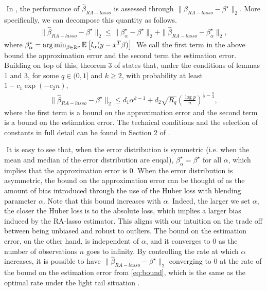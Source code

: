 $ $\newline
In \citet{fan2017estimation}, the performance of $\hat{\beta}_{RA-lasso}$ is assessed through $\| \hat{\beta}_{RA-lasso} - \beta^\star \|_2$. More specifically, we can decompose this quantity as follows.
\begin{align*}
\| \hat{\beta}_{RA-lasso} - \beta^\star \|_2 \leq \| \beta^\star_\alpha - \beta^\star \|_2 + \| \hat{\beta}_{RA-lasso} - \beta^\star_\alpha \|_2,
\end{align*}
where $\beta^\star_\alpha = \argmin_{\beta\in\mathbb{R}^p}\mathbb{E}\left[ l_\alpha (y - x^T\beta) \right]$. We call  the first term in the above bound the approximation error and the second term the estimation error. Building on top of this, theorem 3 of \citet{fan2017estimation} states that, under the conditions of lemmas 1 and 3, for some $q\in(0,1]$ and $k\geq2$, with probability at least $1-c_1\exp(-c_2n)$,
\begin{align}
\| \hat{\beta}_{RA-lasso} - \beta^\star \|_2 \leq d_1\alpha^{k-1} + d_2\sqrt{R_q}\left( \frac{\log p}{n} \right)^{\frac{1}{2} - \frac{q}{4}}, \label{eq:bound}
\end{align}
where the first term is a bound on the approximation error and the second term is a bound on the estimation error. The technical conditions and the selection of constants in full detail can be found in Section 2 of \citet{fan2017estimation}.

$ $\newline
It is easy to see that, when the error distribution is symmetric (i.e. when the mean and median of the error distribution are euqal), $\beta^\star_\alpha = \beta^\star$ for all $\alpha$, which implies that the approximation error is $0$. When the error distribution is asymmetric, the bound on the approximation error can be thought of as the amount of bias introduced through the use of the Huber loss with blending parameter $\alpha$. Note that this bound increases with $\alpha$. Indeed, the larger we set $\alpha$, the closer the Huber loss is to the absolute loss, which implies a larger bias induced by the RA-lasso estimator. This aligns with our intuition on the trade off between being unbiased and robust to outliers. The bound on the estimation error, on the other hand, is independent of $\alpha$, and it converges to $0$ as the number of observations $n$ goes to infinity. By controlling the rate at which $\alpha$ increases, it is possible to have $\| \hat{\beta}_{RA-lasso} - \beta^\star \|_2$ converging to $0$ at the rate of the bound on the estimation error from \cref{eq:bound}, which is the same as the optimal rate under the light tail situation \cite{raskutti2011minimax}.

